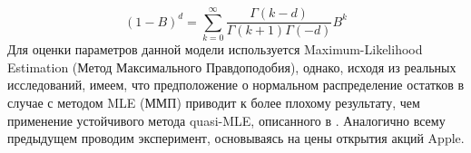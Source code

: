 \begin{equation}
	(1 - B)^d = \sum_{k = 0}^\infty \frac{\Gamma(k - d)}{\Gamma(k + 1)\Gamma(-d)}B^k
\end{equation}
Для оценки параметров данной модели используется Maximum-Likelihood Estimation (Метод Максимального Правдоподобия), однако, исходя из реальных исследований, имеем, что предположение о нормальном распределение остатков в случае с методом MLE (ММП) приводит к более плохому результату, чем применение устойчивого метода quasi-MLE, описанного в \cite{weiss1986asymptotic}. Аналогично всему предыдущем проводим эксперимент, основываясь на цены открытия акций Apple.